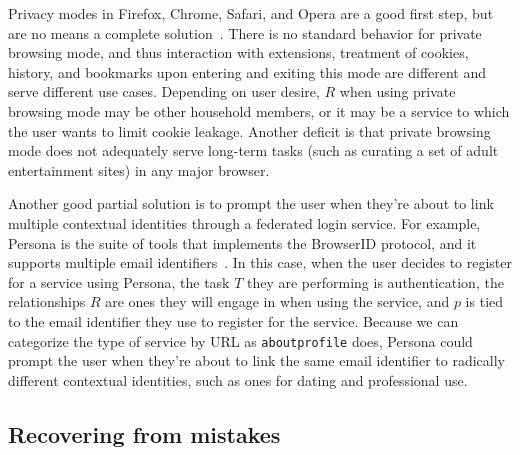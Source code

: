 \documentclass{llncs}
\begin{document}
Privacy modes in Firefox, Chrome, Safari, and Opera are a good first step, but
are no means a complete solution~\cite{ABBJ10}. There is no standard behavior
for private browsing mode, and thus interaction with extensions, treatment of
cookies, history, and bookmarks upon entering and exiting this mode are
different and serve different use cases. Depending on user desire, $R$ when
using private browsing mode may be other household members, or it may be a
service to which the user wants to limit cookie leakage. Another deficit is
that private browsing mode does not adequately serve long-term tasks (such as
curating a set of adult entertainment sites) in any major browser.

Another good partial solution is to prompt the user when they're about to link
multiple contextual identities through a federated login service. For example,
Persona is the suite of tools that implements the BrowserID protocol, and it
supports multiple email identifiers~\cite{browserid}. In this case, when the
user decides to register for a service using Persona, the task $T$ they are
performing is authentication, the relationships $R$ are ones they will engage
in when using the service, and $p$ is tied to the email identifier they use to
register for the service. Because we can categorize the type of service by URL
as \texttt{aboutprofile} does, Persona could prompt the user when they're about
to link the same email identifier to radically different contextual identities,
such as ones for dating and professional use.

\begin{comment}
TODO: Discuss how private browsing mode maps to R, T, P?

At home use case:
R is household
T is porn?
P is null

Searching use case:
R is Google
T is search
P is null

GoogleShring use case
R is Google and the GoogleSharing proxy
T is search or browsing (analytics) (can't use any services that require logon)
P is random
\end{comment}

\subsection{Recovering from mistakes}
\end{document}
